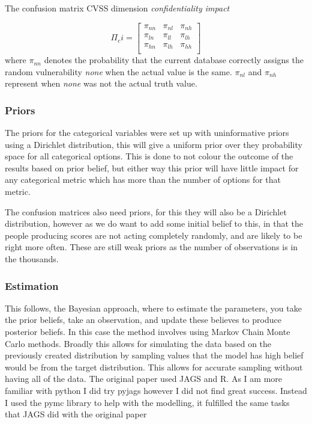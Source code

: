 \documentclass[12pt]{article}
\begin{document}
\bigskip

The confusion matrix CVSS dimension \textit{confidentiality impact}


\begin{equation}
	\Pi_ci = \begin{bmatrix}
		\pi_{nn} & \pi_{nl} & \pi_{nh} \\
		\pi_{ln} & \pi_{ll} & \pi_{lh} \\
		\pi_{hn} & \pi_{lh} & \pi_{hh} \\
	\end{bmatrix}
\end{equation}
where $\pi_{nn}$ denotes the probability that the current database correctly assigns the random
vulnerability \emph{none} when the actual value is the same. $\pi_{nl}$ and $\pi_{nh}$ represent
when \emph{none} was not the actual truth value.

\subsubsection{Priors}

The priors for the categorical variables were set up with uninformative priors using a Dirichlet
distribution, this will give a uniform prior over they probability space for all categorical
options. This is done to not colour the outcome of the results based on prior belief, but either
way this prior will have little impact for any categorical metric which has more than the number of
options for that metric.

The confusion matrices also need priors, for this they will also be a Dirichlet distribution,
however as we do want to add some initial belief to this, in that the people producing scores are
not acting completely randomly, and are likely to be right more often. These are still weak priors
as the number of observations is in the thousands.

\subsubsection{Estimation}

This follows, the Bayesian approach, where to estimate the parameters, you take the prior beliefs,
take an observation, and update these believes to produce posterior beliefs. In this case the method
involves using Markov Chain Monte Carlo methods. Broadly this allows for simulating the data based
on the previously created distribution by sampling values that the model has high belief would be
from the target distribution. This allows for accurate sampling without having all of the data. The
original paper used JAGS \cite{JAGS} and R. As I am more familiar with python I did try
pyjags \cite{pyjags} however I did not find great success. Instead I used the pymc library to help
with the modelling, it fulfilled the same tasks that JAGS did with the original paper \cite{bayes}
\end{document}
